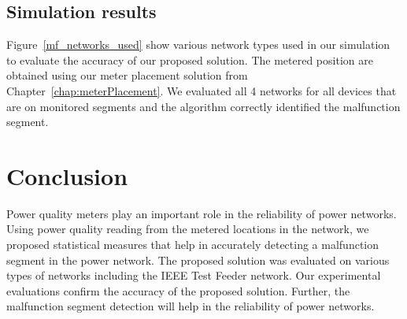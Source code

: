 \subsection{Simulation results}
Figure~\ref{mf_networks_used} show various network types used in our simulation to evaluate the accuracy of our proposed solution. The metered position are obtained using our meter placement solution from Chapter~\ref{chap:meterPlacement}. We evaluated all 4 networks for all devices that are on monitored segments and the algorithm correctly identified the malfunction segment.

\section{Conclusion}
Power quality meters play an important role in the reliability of power networks. Using power quality reading from the metered locations in the network, we proposed statistical measures that help in accurately detecting a malfunction segment in the power network. The proposed solution was evaluated on various types of networks including the IEEE Test Feeder network. Our experimental evaluations confirm the accuracy of the proposed solution. Further, the malfunction segment detection will help in the reliability of power networks.
